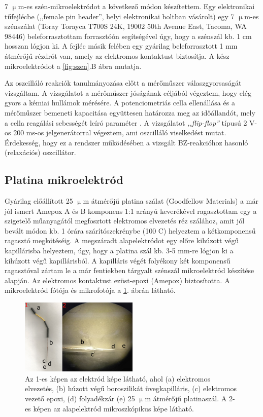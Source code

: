 7 $\upmu$m-es szén-mikroelektródot a következő módon készítettem. Egy elektronikai tűfejlécbe (,,female pin header'', helyi elektronikai boltban vásárolt) egy 7 $\upmu$m-es szénszálat (Toray Torayca T700S 24K, 19002 50th Avenue East, Tacoma, WA 98446) beleforrasztottam forrasztóón segítségével úgy, hogy a szénszál kb. 1 cm hosszan lógjon ki. A fejléc másik felében egy gyárilag beleforrasztott 1 mm átmérőjű rézdrót van, amely az elektromos kontaktust biztosítja. A kész mikroelektródot a \ref{fig:szen}.B ábra mutatja.


Az oszcilláló reakciók tanulmányozása előtt a mérőműszer válaszgyorsaságát vizsgáltam. A vizsgálatot a mérőműszer jóságának céljából végeztem, hogy elég gyors a kémiai hullámok mérésére. A potenciometriás cella ellenállása és a mérőműszer bemeneti kapacitása együttesen határozza meg az időállandót, mely a cella reagálási sebességét leíró paraméter \cite{kiss2015deconvolution}. A vizsgálatot \emph{,,flip-flop''} típusú 2 V-os 200 ms-os jelgenerátorral végeztem, ami oszcilláló viselkedést mutat. Érdekesség, hogy ez a rendszer működésében a vizsgált BZ-reakcióhoz hasonló (relaxációs) oszcillátor.

\subsection{Platina mikroelektród}
Gyárilag előállított 25 $\upmu$m átmérőjű platina szálat (Goodfellow Materials) a már jól ismert Amepox A és B komponens 1:1 arányú keverékével ragasztottam egy a szigetelő műanyagától megfosztott elektromos elvezetés réz szálához, amit jól bevált módon kb. 1 órára szárítószekrénybe (100 \textdegree C) helyeztem a kétkomponensű ragasztó megkötéséig. A megszáradt alapelektródot egy előre kihúzott végű kapillárisba helyeztem, úgy, hogy a platina szál kb. 3-5 mm-re lógjon ki a kihúzott végű kapillárisból. A kapilláris végét folyékony két komponensű ragasztóval zártam le a már fentiekben tárgyalt szénszál mikroelektród készítése alapján. Az elektromos kontaktust ezüst-epoxi (Amepox) biztosította. A mikroelektród fótója és mikrofotója a \ref{fig:platina}. ábrán látható.
\begin{figure}
\centering
\includegraphics[width=0.5\textwidth]{img/platina.png}
\caption{Az 1-es képen az elektród képe látható, ahol (a) elektromos elvezetés, (b) húzott végű boroszilikát üvegkapilláris, (c) elektromos vezető epoxi, (d) folyadékzár  (e) 25 $\upmu$m átmérőjű platinaszál. A 2-es képen az alapelektród mikroszkópikus képe látható.}
\label{fig:platina}
\end{figure}


